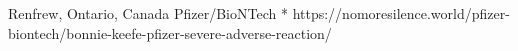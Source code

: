           {Renfrew, Ontario, Canada}
          {}
          {Pfizer/BioNTech}
          {*}
          {
          }
          {https://nomoresilence.world/pfizer-biontech/bonnie-keefe-pfizer-severe-adverse-reaction/}

